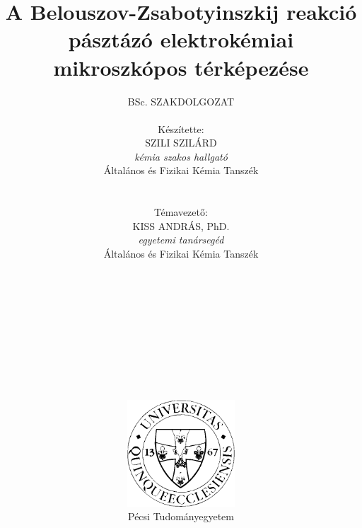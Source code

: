 \pagestyle{empty}

\title{\textbf{A Belouszov-Zsabotyinszkij reakció pásztázó elektrokémiai mikroszkópos térképezése}}

\author{BSc. SZAKDOLGOZAT\\
\\ Készítette:\\ 
SZILI SZILÁRD \\
\emph{kémia szakos hallgató}\\
Általános és Fizikai Kémia Tanszék \\
\\ \\
Témavezető: \\
KISS ANDRÁS, PhD. \\
\emph{egyetemi tanársegéd} \\
Általános és Fizikai Kémia Tanszék \\
\\ \\ \\ \\ \\ \\ \\ \\ \\ \\
\includegraphics[width=0.3\textwidth]{img/pte_logo.eps} \\ Pécsi Tudományegyetem}

\maketitle
\pagestyle{plain}

\large
\setcounter{tocdepth}{4}
\tableofcontents
